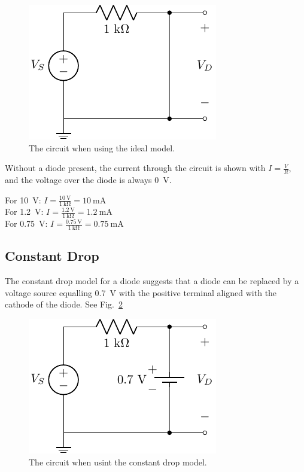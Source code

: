 \documentclass{../../ece-report}
\begin{document}
\begin{figure}[h!]
  \centering
  \includegraphics{../circuits/circuit_ideal.pdf}
  \caption{The circuit when using the ideal model.}
  \label{fig:ideal}
\end{figure}

Without a diode present, the current through the circuit is shown
with $I = \frac{V}{R}$, and the voltage over the diode is always 0~V.

For 10~V: $I=\frac{10~\si{\V}}{1~\si{\kohm}} = 10~\si{\mA}$ \\
For 1.2~V: $I=\frac{1.2~\si{\V}}{1~\si{\kohm}} = 1.2~\si{\mA}$ \\
For 0.75~V: $I=\frac{0.75~\si{\V}}{1~\si{\kohm}} = 0.75~\si{\mA}$


\subsection{Constant Drop}

The constant drop model for a diode suggests that a diode
can be replaced by a voltage source equalling 0.7~V with the positive
terminal aligned with the cathode of the diode. See Fig.~\ref{fig:constant}

\begin{figure}[h!]
  \centering
  \includegraphics{../circuits/circuit_constant.pdf}
  \caption{The circuit when usint the constant drop model.}
  \label{fig:constant}
\end{figure}
\end{document}
